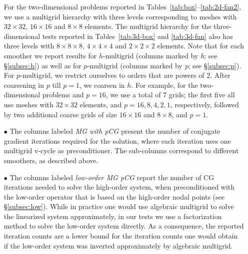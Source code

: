 \documentclass[smallcondensed,final]{svjour3}     %
\begin{document}
\begin{itemize}
    For the two-dimensional problems reported in
    Tables~\ref{tab:box}--\ref{tab:2d-fan2}, we use a multigrid
    hierarchy with three levels corresponding to meshes with
    $32\times32$, $16\times16$ and $8\times8$ elements.
    The multigrid hierarchy for the three-dimensional
    tests reported in Tables~\ref{tab:3d-box} and \ref{tab:3d-fan}
    also has three levels with
    $8\times8\times8$, $4\times4\times4$ and $2\times2\times2$
    elements.  Note that for each smoother we report results
    for $h$-multigrid (columns marked by \emph{h}; see
    \S\ref{subsec:h}) as well as for $p$-multigrid (columns marked by
    \emph{p}; see \S\ref{subsec:p}). For $p$-multigrid, we restrict
    ourselves to orders that are powers of 2. After coarsening in $p$
    till $p=1$, we coarsen in $h$. For example, for the
    two-dimensional problems and $p=16$, we use a total of 7 grids;
    the first five all use meshes with $32\times32$ elements,
    and $p=16,8,4,2,1$, respectively, followed by two additional
    coarse grids of size $16\times16$ and $8\times8$, and
    $p=1$.
\item[$\bullet$] The columns labeled \emph{MG with pCG} present the
  number of conjugate gradient iterations required for the solution,
  where each iteration uses one multigrid v-cycle as preconditioner.
  The sub-columns correspond to different smoothers, as described
  above.
\item[$\bullet$] The columns labeled \emph{low-order MG pCG} report
  the number of CG iterations needed to solve the high-order system,
  when preconditioned with the low-order operator that is based on the
  high-order nodal points (see \S\ref{subsec:low}).  While in practice
  one would use algebraic multigrid to solve the linearized system
  approximately, in our tests we use a factorization method to solve
  the low-order system directly.  As a consequence, the reported
  iteration counts are a lower bound for the iteration counts one
  would obtain if the low-order system was inverted approximately by
  algebraic multigrid.


\end{itemize}
\end{document}
